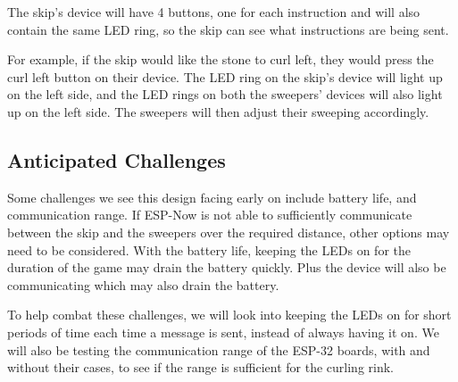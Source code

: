 \documentclass{article}
\begin{document}
The skip's device will have 4 buttons, one for each instruction and will also contain the same LED ring, so the skip can see what instructions are being sent. 

For example, if the skip would like the stone to curl left, they would press the curl left button on their device. The LED ring on the skip's device will light up on the left side, and the LED rings on both the sweepers' devices will also light up on the left side. The sweepers will then adjust their sweeping accordingly.

\subsection{Anticipated Challenges}
Some challenges we see this design facing early on include battery life, and communication range. If ESP-Now is not able to sufficiently communicate between the skip and the sweepers over the required distance, other options may need to be considered. With the battery life, keeping the LEDs on for the duration of the game may drain the battery quickly. Plus the device will also be communicating which may also drain the battery.

To help combat these challenges, we will look into keeping the LEDs on for short periods of time each time a message is sent, instead of always having it on. We will also be testing the communication range of the ESP-32 boards, with and without their cases, to see if the range is sufficient for the curling rink.

\end{document}
